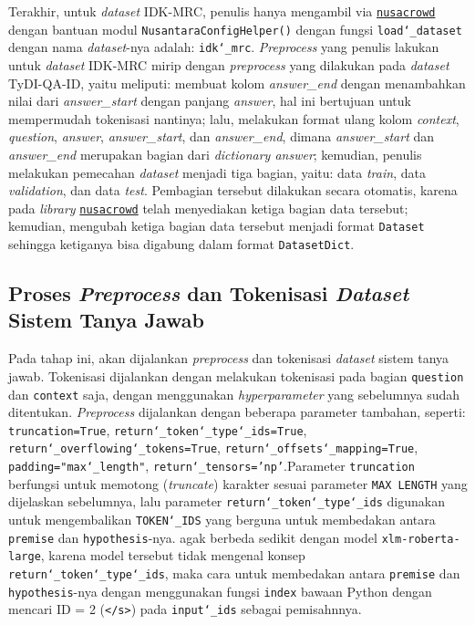 Terakhir, untuk \emph{dataset} IDK-MRC, penulis hanya mengambil via \href{https://github.com/IndoNLP/nusa-crowd/tree/master/nusacrowd/nusa_datasets/}{\texttt{nusacrowd}} dengan bantuan modul \texttt{NusantaraConfigHelper()} dengan fungsi \texttt{load\char`_dataset} dengan nama \emph{dataset}-nya adalah: \texttt{idk\char`_mrc}. \emph{Preprocess} yang penulis lakukan untuk \emph{dataset} IDK-MRC mirip dengan \emph{preprocess} yang dilakukan pada \emph{dataset} TyDI-QA-ID, yaitu meliputi: membuat kolom \emph{answer\_end} dengan menambahkan nilai dari \emph{answer\_start} dengan panjang \emph{answer}, hal ini bertujuan untuk mempermudah tokenisasi nantinya; lalu, melakukan format ulang kolom \emph{context}, \emph{question}, \emph{answer}, \emph{answer\_start}, dan \emph{answer\_end}, dimana  \emph{answer\_start} dan \emph{answer\_end} merupakan bagian dari \emph{dictionary answer}; kemudian, penulis melakukan pemecahan \emph{dataset} menjadi tiga bagian, yaitu: data \emph{train}, data \emph{validation}, dan data \emph{test}. Pembagian tersebut dilakukan secara otomatis, karena pada \emph{library} \href{https://github.com/IndoNLP/nusa-crowd/tree/master/nusacrowd/nusa_datasets/}{\texttt{nusacrowd}} telah menyediakan ketiga bagian data tersebut; kemudian, mengubah ketiga bagian data tersebut menjadi format \texttt{Dataset} sehingga ketiganya bisa digabung dalam format \texttt{DatasetDict}.

\subsection{Proses \emph{Preprocess} dan Tokenisasi \emph{Dataset} Sistem Tanya Jawab}
Pada tahap ini, akan dijalankan  \emph{preprocess} dan tokenisasi \emph{dataset} sistem tanya jawab. Tokenisasi dijalankan dengan melakukan tokenisasi pada bagian \texttt{question} dan \texttt{context} saja, dengan menggunakan \emph{hyperparameter} yang sebelumnya sudah ditentukan. \emph{Preprocess} dijalankan dengan beberapa parameter tambahan, seperti: \texttt{truncation=True}, \texttt{return\char`_token\char`_type\char`_ids=True}, \texttt{return\char`_overflowing\char`_tokens=True}, \texttt{return\char`_offsets\char`_mapping=True}, \texttt{padding="max\char`_length"}, \texttt{return\char`_tensors='np'}.Parameter \texttt{truncation} berfungsi untuk memotong (\emph{truncate}) karakter sesuai parameter \texttt{MAX LENGTH} yang dijelaskan sebelumnya, lalu parameter \texttt{return\char`_token\char`_type\char`_ids} digunakan untuk mengembalikan \texttt{TOKEN\char`_IDS} yang berguna untuk membedakan antara \texttt{premise} dan \texttt{hypothesis}-nya. agak berbeda sedikit dengan model \texttt{xlm-roberta-large}, karena model tersebut tidak mengenal konsep \texttt{return\char`_token\char`_type\char`_ids}, maka cara untuk membedakan antara \texttt{premise} dan \texttt{hypothesis}-nya dengan menggunakan fungsi \texttt{index} bawaan Python dengan mencari ID = 2 (\texttt{</s>}) pada \texttt{input\char`_ids} sebagai pemisahnnya. 

